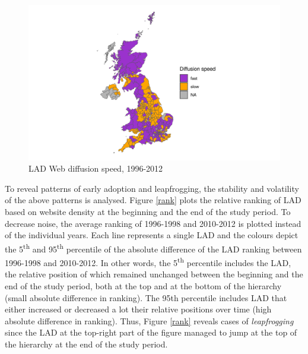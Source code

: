 \documentclass[
  authoryear,
  preprint,
  3p]{elsarticle}
\begin{document}
\begin{figure}[H]

{\centering \includegraphics[width=1\textwidth,height=\textheight]{../../outputs/s/speed_map.png}

}

\caption{\label{s_map}LAD Web diffusion speed, 1996-2012}

\end{figure}%

To reveal patterns of early adoption and leapfrogging, the stability and
volatility of the above patterns is analysed. Figure \ref{rank} plots
the relative ranking of LAD based on website density at the beginning
and the end of the study period. To decrease noise, the average ranking
of 1996-1998 and 2010-2012 is plotted instead of the individual years.
Each line represents a single LAD and the colours depict the
5\textsuperscript{th} and 95\textsuperscript{th} percentile of the
absolute difference of the LAD ranking between 1996-1998 and 2010-2012.
In other words, the 5\textsuperscript{th} percentile includes the LAD,
the relative position of which remained unchanged between the beginning
and the end of the study period, both at the top and at the bottom of
the hierarchy (small absolute difference in ranking). The 95th
percentile includes LAD that either increased or decreased a lot their
relative positions over time (high absolute difference in ranking).
Thus, Figure \ref{rank} reveals cases of \emph{leapfrogging} since the
LAD at the top-right part of the figure managed to jump at the top of
the hierarchy at the end of the study period.
\end{document}
